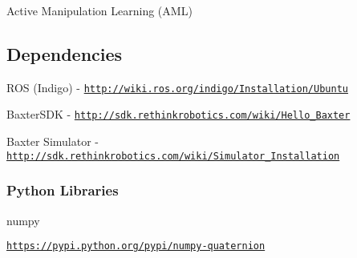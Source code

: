Active Manipulation Learning (A\+ML)

\subsection*{Dependencies}


\begin{DoxyItemize}
\item R\+OS (Indigo) -\/ \href{http://wiki.ros.org/indigo/Installation/Ubuntu}{\tt http\+://wiki.\+ros.\+org/indigo/\+Installation/\+Ubuntu}
\item Baxter\+S\+DK -\/ \href{http://sdk.rethinkrobotics.com/wiki/Hello_Baxter}{\tt http\+://sdk.\+rethinkrobotics.\+com/wiki/\+Hello\+\_\+\+Baxter}
\item Baxter Simulator -\/ \href{http://sdk.rethinkrobotics.com/wiki/Simulator_Installation}{\tt http\+://sdk.\+rethinkrobotics.\+com/wiki/\+Simulator\+\_\+\+Installation}
\end{DoxyItemize}

\subsubsection*{Python Libraries}


\begin{DoxyItemize}
\item numpy
\item \href{https://pypi.python.org/pypi/numpy-quaternion}{\tt https\+://pypi.\+python.\+org/pypi/numpy-\/quaternion} 
\end{DoxyItemize}